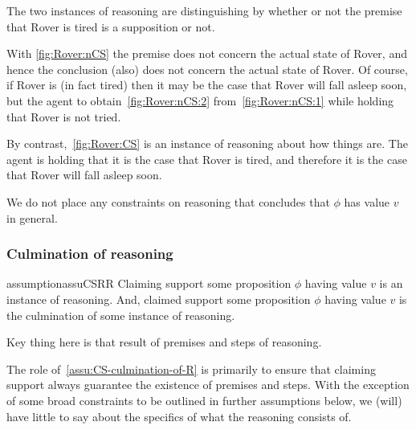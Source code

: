 \begin{note}
  The two instances of reasoning are distinguishing by whether or not the premise that Rover is tired is a supposition or not.

  With \autoref{fig:Rover:nCS} the premise does not concern the actual state of Rover, and hence the conclusion (also) does not concern the actual state of Rover.
  Of course, if Rover is (in fact tired) then it may be the case that Rover will fall asleep soon, but the agent to obtain~\ref{fig:Rover:nCS:2} from~\ref{fig:Rover:nCS:1} while holding that Rover is not tried.

  By contrast,~\autoref{fig:Rover:CS} is an instance of reasoning about how things are.
  The agent is holding that it is the case that Rover is tired, and therefore it is the case that Rover will fall asleep soon.
\end{note}



\begin{note}
  We do not place any constraints on reasoning that concludes that \(\phi\) has value \(v\) in general.
\end{note}

\subsubsection{Culmination of reasoning}

\begin{note}
  \begin{restatable}{assumption}{assuCSRR}
    \label{assu:CS-culmination-of-R}
    Claiming support some proposition \(\phi\) having value \(v\) is an instance of reasoning.
    And, claimed support some proposition \(\phi\) having value \(v\) is the culmination of some instance of reasoning.
  \end{restatable}
\end{note}

\begin{note}
  Key thing here is that result of premises and steps of reasoning.

  The role of~\autoref{assu:CS-culmination-of-R} is primarily to ensure that claiming support always guarantee the existence of premises and steps.
  With the exception of some broad constraints to be outlined in further assumptions below, we (will) have little to say about the specifics of what the reasoning consists of.
\end{note}

